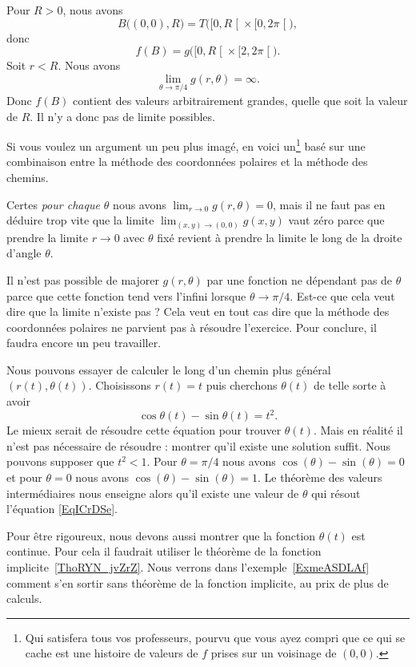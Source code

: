 \begin{example}
    Pour \( R>0\), nous avons
    \begin{equation}
        B\big( (0,0),R \big)=T\big( \mathopen[ 0 , R \mathclose[\times \mathopen[ 0 , 2\pi \mathclose[ \big),
    \end{equation}
    donc
    \begin{equation}
        f(B)=g\big( \mathopen[ 0 , R \mathclose[\times \mathopen[ 2 , 2\pi \mathclose[ \big).
    \end{equation}
    Soit \( r<R\). Nous avons
    \begin{equation}
        \lim_{\theta\to \pi/4} g(r,\theta)=\infty.
    \end{equation}
    Donc \( f(B)\) contient des valeurs arbitrairement grandes, quelle que soit la valeur de \( R\). Il n'y a donc pas de limite possibles.
    
    Si vous voulez un argument un peu plus imagé, en voici un\footnote{Qui satisfera tous vos professeurs, pourvu que vous ayez compri que ce qui se cache est une histoire de valeurs de \( f\) prises sur un voisinage de \( (0,0)\).} basé sur une combinaison entre la méthode des coordonnées polaires et la méthode des chemins.
    
	Certes \emph{pour chaque $\theta$} nous avons $\lim_{r\to 0} g(r,\theta)=0$, mais il ne faut pas en déduire trop vite que la limite $\lim_{(x,y)\to(0,0)}g(x,y)$ vaut zéro parce que prendre la limite $r\to 0$ avec $\theta$ fixé revient à prendre la limite le long de la droite d'angle $\theta$.

	Il n'est pas possible de majorer $g(r,\theta)$ par une fonction ne dépendant pas de $\theta$ parce que cette fonction tend vers l'infini lorsque $\theta\to\pi/4$. Est-ce que cela veut dire que la limite n'existe pas ? Cela veut en tout cas dire que la méthode des coordonnées polaires ne parvient pas à résoudre l'exercice. Pour conclure, il faudra encore un peu travailler.

    Nous pouvons essayer de calculer le long d'un chemin plus général \( (r(t),\theta(t))\). Choisissons \( r(t)=t\) puis cherchons \( \theta(t)\) de telle sorte à avoir
    \begin{equation}        \label{EqICrDSe}
        \cos\theta(t)-\sin\theta(t)=t^2.
    \end{equation}
    Le mieux serait de résoudre cette équation pour trouver \( \theta(t)\). Mais en réalité il n'est pas nécessaire de résoudre : montrer qu'il existe une solution suffit. Nous pouvons supposer que \( t^2<1\). Pour \( \theta=\pi/4\) nous avons \( \cos(\theta)-\sin(\theta)=0\) et pour \( \theta=0\) nous avons \( \cos(\theta)-\sin(\theta)=1\). Le théorème des valeurs intermédiaires nous enseigne alors qu'il existe une valeur de \( \theta\) qui résout l'équation \eqref{EqICrDSe}.

    Pour être rigoureux, nous devons aussi montrer que la fonction \( \theta(t)\) est continue. Pour cela il faudrait utiliser le théorème de la fonction implicite~\ref{ThoRYN_jvZrZ}.
    Nous verrons dans l'exemple~\ref{ExmeASDLAf} comment s'en sortir sans théorème de la fonction implicite, au prix de plus de calculs.
\end{example}

